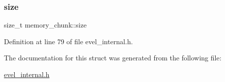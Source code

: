 \subsubsection{\texorpdfstring{size}{size}}
{\footnotesize\ttfamily size\+\_\+t memory\+\_\+chunk\+::size}



Definition at line 79 of file evel\+\_\+internal.\+h.



The documentation for this struct was generated from the following file\+:\begin{DoxyCompactItemize}
\item 
\hyperlink{evel__internal_8h}{evel\+\_\+internal.\+h}\end{DoxyCompactItemize}
